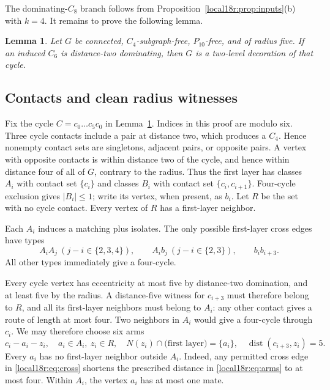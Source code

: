 \documentclass[11pt,a4paper]{article}
\newtheorem{lemma}[theorem]{Lemma}
\theoremstyle{definition}\newtheorem{definition}[theorem]{Definition}
\theoremstyle{remark}\newtheorem{remark}[theorem]{Remark}
\begin{document}
The dominating-$C_8$ branch follows from Proposition~\ref{local18r:prop:inputs}(b)
with $k=4$. It remains to prove the following lemma.
\begin{lemma}\label{local18r:lem:two}
Let $G$ be connected, $C_4$-subgraph-free, $P_{10}$-free, and of radius
five. If an induced $C_6$ is distance-two dominating, then $G$ is a two-level
decoration of that cycle.
\end{lemma}

\subsection{Contacts and clean radius witnesses}
Fix the cycle $C=c_0\dots c_5c_0$ in Lemma~\ref{local18r:lem:two}. Indices in
this proof are modulo six. Three cycle contacts include a pair at
distance two, which produces a $C_4$. Hence nonempty contact sets are
singletons, adjacent pairs, or opposite pairs. A vertex with opposite
contacts is within distance two of the cycle, and hence within distance
four of all of $G$, contrary to the radius. Thus the first layer has
classes $A_i$ with contact set $\{c_i\}$ and classes $B_i$ with contact
set $\{c_i,c_{i+1}\}$. Four-cycle exclusion gives $|B_i|\le1$; write its
vertex, when present, as $b_i$. Let $R$ be the set with no cycle contact.
Every vertex of $R$ has a first-layer neighbor.

Each $A_i$ induces a matching plus isolates. The only possible
first-layer cross edges have types
\begin{equation}\label{local18r:eq:cross}
 A_iA_j\ (j-i\in\{2,3,4\}),\qquad
 A_i b_j\ (j-i\in\{2,3\}),\qquad b_i b_{i+3}.
\end{equation}
All other types immediately give a four-cycle.

Every cycle vertex has eccentricity at most five by distance-two domination,
and at least five by the radius. A distance-five witness for $c_{i+3}$
must therefore belong to $R$, and all its first-layer neighbors must
belong to $A_i$: any other contact gives a route of length at most four.
Two neighbors in $A_i$ would give a four-cycle through $c_i$. We may
therefore choose six arms
\begin{equation}\label{local18r:eq:arms}
 c_i-a_i-z_i,\quad a_i\in A_i,\ z_i\in R,\quad
 N(z_i)\cap\text{(first layer)}=\{a_i\},\quad
 \operatorname{dist}(c_{i+3},z_i)=5.
\end{equation}
Every $a_i$ has no first-layer neighbor outside $A_i$. Indeed, any
permitted cross edge in \eqref{local18r:eq:cross} shortens the prescribed distance
in \eqref{local18r:eq:arms} to at most four. Within $A_i$, the vertex $a_i$ has
at most one mate.
\end{document}
